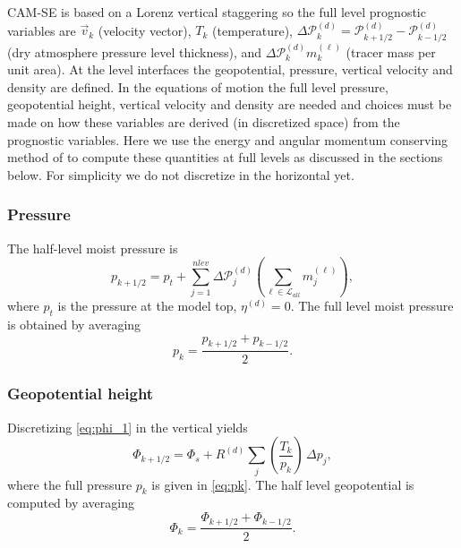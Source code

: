 \documentclass{agujournal}
\begin{document}
{CAM-SE is based on a Lorenz vertical staggering so the full level prognostic variables are $\vec{v}_k$ (velocity vector), $T_k$ (temperature), $\Delta \mathcal{P}^{(d)}_k=\mathcal{P}^{(d)}_{k+1/2}-\mathcal{P}^{(d)}_{k-1/2}$ (dry atmosphere pressure level thickness), and $\Delta \mathcal{P}^{(d)}_k m_k^{(\ell)}$ (tracer mass per unit area). At the level interfaces the geopotential, pressure, vertical velocity and density are defined. In the equations of motion the full level pressure, geopotential height, vertical velocity and density are needed and choices must be made on how these variables are derived (in discretized space) from the prognostic variables. Here we use the energy and angular momentum conserving method of \citet{SB1981MWR} to compute these quantities at full levels as discussed in the sections below. For simplicity we do not discretize in the horizontal yet.
\subsubsection{Pressure}\label{sec:pk}
The half-level moist pressure is
\begin{equation}
p_{k+1/2}=p_t+\sum_{j=1}^{nlev}\Delta \mathcal{P}^{(d)}_j \left(\sum_{\ell \in \mathcal{L}_{all}} m_j^{(\ell)}\right),\label{eq:halfpfull}
\end{equation}
where $p_t$ is the pressure at the model top, $\eta^{(d)}=0$.
The full level moist pressure is obtained by averaging \citep{SB1981MWR}
\begin{equation}
p_k=\frac{p_{k+1/2}+p_{k-1/2}}{2}.\label{eq:pk}
\end{equation}
\subsubsection{Geopotential height}
Discretizing \eqref{eq:phi_1} in the vertical yields
\begin{equation}
\Phi_{k+1/2}=\Phi_s+R^{(d)}\sum_j \left( \frac{T_k}{p_k}\right)\, \Delta p_j,
\end{equation}
where the full pressure $p_k$ is given in \eqref{eq:pk}. The half level geopotential is computed by averaging
\begin{equation}
\Phi_k=\frac{\Phi_{k+1/2}+\Phi_{k-1/2}}{2}.
\end{equation}
}
\end{document}
